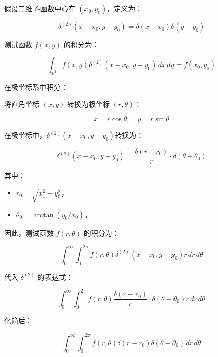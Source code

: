 \documentclass[lang=cn,10pt,newtx,bibend=biber,device=pad]{elegantbook}
\begin{document}
\begin{example}

假设二维 $\delta$-函数中心在 $(x_0, y_0)$，定义为：

\begin{equation}
\delta^{(2)}(x - x_0, y - y_0) = \delta(x - x_0) \delta(y - y_0)
\end{equation}

测试函数 $f(x, y)$ 的积分为：

\begin{equation}
\int_{\mathbb{R}^2} f(x, y) \delta^{(2)}(x - x_0, y - y_0) \, dx \, dy = f(x_0, y_0)
\end{equation}

在极坐标系中积分：

将直角坐标 $(x, y)$ 转换为极坐标 $(r, \theta)$：

\begin{equation}
x = r \cos\theta, \quad y = r \sin\theta
\end{equation}

在极坐标中，$\delta^{(2)}(x - x_0, y - y_0)$转换为：

\begin{equation}
\delta^{(2)}(x - x_0, y - y_0) = \frac{\delta(r - r_0)}{r} \cdot \delta(\theta - \theta_0)
\end{equation}

其中：
\begin{itemize}
    \item $r_0 = \sqrt{x_0^2 + y_0^2}$，
    \item $\theta_0 = \arctan(y_0 / x_0)$。
\end{itemize}

因此，测试函数 $f(r, \theta)$ 的积分为：

\begin{equation}
\int_{0}^\infty \int_{0}^{2\pi} f(r, \theta) \delta^{(2)}(x - x_0, y - y_0) r \, dr \, d\theta
\end{equation}

代入 $\delta^{(2)}$ 的表达式：

\begin{equation}
\int_{0}^\infty \int_{0}^{2\pi} f(r, \theta) \frac{\delta(r - r_0)}{r} \cdot \delta(\theta - \theta_0) r \, dr \, d\theta
\end{equation}

化简后：

\begin{equation}
\int_{0}^\infty \int_{0}^{2\pi} f(r, \theta) \delta(r - r_0) \delta(\theta - \theta_0) \, dr \, d\theta
\end{equation}


\end{example}
\end{document}
